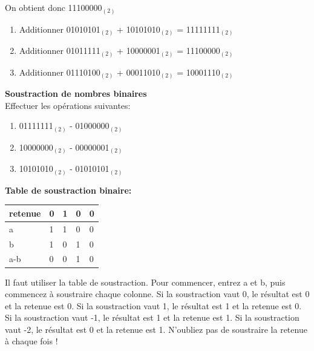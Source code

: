 \begin{Exercice}[15 minutes]
\begin{solution}
        On obtient donc 11100000$_{(2)}$ \\
        \begin{enumerate}
            \item Additionner 01010101$_{(2)}$ + 10101010$_{(2)}$ = 11111111$_{(2)}$
            \item Additionner 01011111$_{(2)}$ + 10000001$_{(2)}$ = 11100000$_{(2)}$
            \item Additionner 01110100$_{(2)}$ + 00011010$_{(2)}$ = 10001110$_{(2)}$
        \end{enumerate}

    \end{solution}
\end{Exercice}

\begin{Exercice}[15 minutes] \textbf{Soustraction de nombres binaires}\\
    Effectuer les opérations suivantes:

    \begin{enumerate}
        \item 01111111$_{(2)}$ - 01000000$_{(2)}$
        \item 10000000$_{(2)}$ - 00000001$_{(2)}$
        \item 10101010$_{(2)}$ - 01010101$_{(2)}$
    \end{enumerate}

    \begin{conseil}
        \textbf{Table de soustraction binaire:}\\
         \begin{tabular}{| C{0.1\textwidth} | C{0.1\textwidth} | C{0.1\textwidth} | C{0.1\textwidth} | C{0.1\textwidth} |} 
            \hline
            retenue & 0 & 1 & 0 & 0 \\ [0.5ex] 
            \hline
            a & 1 & 1 & 0 & 0 \\ [0.5ex] 
            \hline
            b & 1 & 0 & 1 & 0 \\ [0.5ex] 
            \hline
            a-b & 0 & 0 & 1 & 0 \\ [0.5ex] 
            \hline
        \end{tabular}
    \end{conseil}
    \begin{solution}
        Il faut utiliser la table de soustraction. Pour commencer, entrez a et b, puis commencez à soustraire chaque colonne. Si la soustraction vaut 0, le résultat est 0 et la retenue est 0. Si la soustraction vaut 1, le résultat est 1 et la retenue est 0. Si la soustraction vaut -1, le résultat est 1 et la retenue est 1. Si la soustraction vaut -2, le résultat est 0 et la retenue est 1. N'oubliez pas de soustraire la retenue à chaque fois ! \\


\end{solution}
\end{Exercice}
